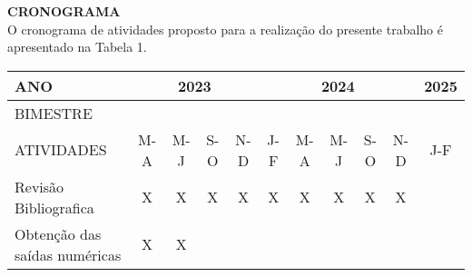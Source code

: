 \documentclass[portuguese,12pt,a4paper]{article}
\begin{document}
\textbf{CRONOGRAMA} \\

O cronograma de atividades proposto para a realização do presente trabalho é
apresentado na Tabela 1. 
\begin{table}[H]

	\centering

	\begin{adjustbox}{width=1\textwidth}

	\begin{tabular}{|l|cccc|ccccc|c|}
		\hline
		ANO                            & \multicolumn{4}{c|}{2023}                                                                                                                                                & \multicolumn{5}{c|}{2024}                                                                                                                                                                                 & 2025                  \\ \hline
		BIMESTRE                       & \multicolumn{1}{c|}{}                          & \multicolumn{1}{c|}{}                          & \multicolumn{1}{c|}{}                          &                       & \multicolumn{1}{c|}{}                      & \multicolumn{1}{c|}{}                      & \multicolumn{1}{c|}{}                      & \multicolumn{1}{c|}{}                      &                       &                       \\ \cline{1-1}
		ATIVIDADES                     & \multicolumn{1}{c|}{\multirow{-2}{*}{M-A}}     & \multicolumn{1}{c|}{\multirow{-2}{*}{M-J}}     & \multicolumn{1}{c|}{\multirow{-2}{*}{S-O}}     & \multirow{-2}{*}{N-D} & \multicolumn{1}{c|}{\multirow{-2}{*}{J-F}} & \multicolumn{1}{c|}{\multirow{-2}{*}{M-A}} & \multicolumn{1}{c|}{\multirow{-2}{*}{M-J}} & \multicolumn{1}{c|}{\multirow{-2}{*}{S-O}} & \multirow{-2}{*}{N-D} & \multirow{-2}{*}{J-F} \\ \hline
		Revisão Bibliografica          & \multicolumn{1}{c|}{\cellcolor[HTML]{9B9B9B}X} & \multicolumn{1}{c|}{\cellcolor[HTML]{9B9B9B}X} & \multicolumn{1}{c|}{\cellcolor[HTML]{C0C0C0}X} & X                     & \multicolumn{1}{c|}{X}                     & \multicolumn{1}{c|}{X}                     & \multicolumn{1}{c|}{X}                     & \multicolumn{1}{c|}{X}                     & X                     &                       \\ \hline
		Obtenção das saídas numéricas  & \multicolumn{1}{c|}{\cellcolor[HTML]{9B9B9B}X} & \multicolumn{1}{c|}{\cellcolor[HTML]{9B9B9B}X} & \multicolumn{1}{c|}{}                          &                       & \multicolumn{1}{c|}{}                      & \multicolumn{1}{c|}{}                      & \multicolumn{1}{c|}{}                      & \multicolumn{1}{c|}{}                      &                       &                       \\ \hline

\end{tabular}
\end{adjustbox}
\end{table}
\end{document}
